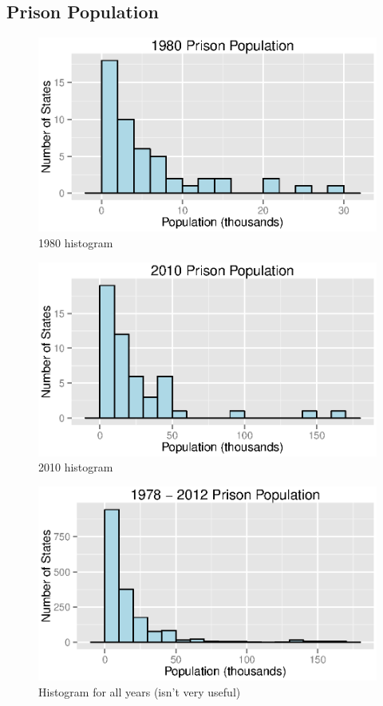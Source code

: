 \documentclass{exam}
\begin{document}
  \subsection{Prison Population}

  \begin{figure}[H]
    \centering
    \includegraphics[scale = 0.9]{figures/population_histogram_1980.eps}
    \caption{1980 histogram}
  \end{figure}

  \begin{figure}[H]
    \centering
    \includegraphics[scale = 0.9]{figures/population_histogram_2010.eps}
    \caption{2010 histogram}
  \end{figure}

  \begin{figure}[H]
    \centering
    \includegraphics[scale = 0.9]{figures/population_histogram_all_years.eps}
    \caption{Histogram for all years (isn't very useful)}
  \end{figure}
\end{document}
